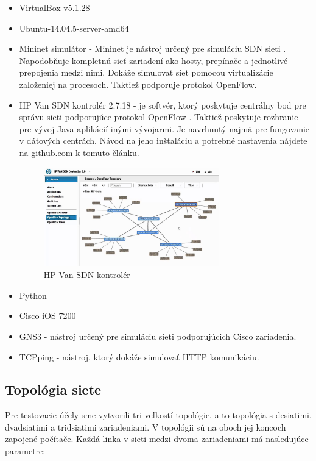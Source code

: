 \documentclass[conference]{IEEEtran}
\begin{document}
\begin{itemize}
\item{VirtualBox v5.1.28}
\item{Ubuntu-14.04.5-server-amd64}
\item{Mininet simulátor -}
Mininet je nástroj určený pre simuláciu SDN sieti \cite{fifth}. Napodobňuje kompletnú sieť zariadení ako hosty, prepínače a jednotlivé prepojenia medzi nimi. Dokáže simulovať sieť pomocou virtualizácie založeniej na procesoch. Taktiež podporuje protokol OpenFlow.
\item{HP Van SDN kontrolér 2.7.18 -} je softvér, ktorý poskytuje centrálny bod pre správu sieti podporujúce protokol OpenFlow \cite{sixth}. Taktiež poskytuje rozhranie pre vývoj Java aplikácií inými vývojarmi. Je navrhnutý najmä pre fungovanie v dátových centrách. Návod na jeho inštaláciu a potrebné nastavenia nájdete na \url{github.com} k tomuto článku.

\begin{figure}[h!]
\centering
\includegraphics[width=3in]{../img/HPVAN}
\caption{HP Van SDN kontrolér}
\end{figure}


\item{Python}
\item{Cisco iOS 7200}
\item{GNS3 -} nástroj určený pre simuláciu sieti podporujúcich Cisco zariadenia.
\item{TCPping -} nástroj, ktorý dokáže simulovať HTTP komunikáciu.
\end{itemize}

\subsection{Topológia siete \label{topo}}

Pre testovacie účely sme vytvorili tri veľkostí topológie, a to topológia s desiatimi, dvadsiatimi a tridsiatimi zariadeniami. V topológii sú na oboch jej koncoch zapojené počítače. Každá linka v sieti medzi dvoma zariadeniami má nasledujúce parametre:
\end{document}

